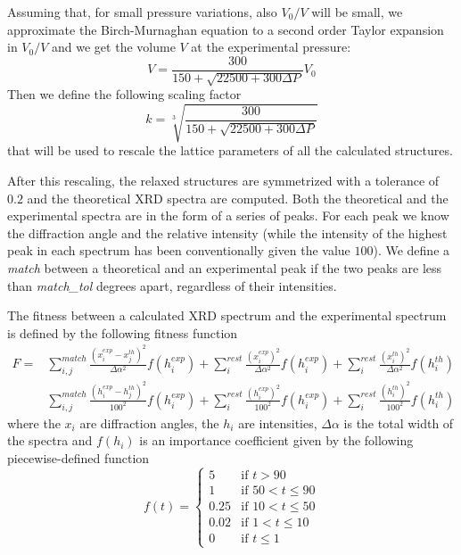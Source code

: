\documentclass{article}
\begin{document}
Assuming that, for small pressure variations, also $V_0/V$ will be small, we approximate the Birch-Murnaghan equation to a second order Taylor expansion in $V_0/V$ and we get the volume $V$ at the experimental pressure:
\begin{equation*}
	V = \frac{300}{150 + \sqrt{22500 + 300 \Delta P}} V_0
\end{equation*}
Then we define the following scaling factor
\begin{equation*}
	k = \sqrt[3]{\frac{300}{150 + \sqrt{22500 + 300 \Delta P}}}
\end{equation*}
that will be used to rescale the lattice parameters of all the calculated structures.

After this rescaling, the relaxed structures are symmetrized with a tolerance of $0.2$ and the theoretical XRD spectra are computed. Both the theoretical and the experimental spectra are in the form of a series of peaks. For each peak we know the diffraction angle and the relative intensity (while the intensity of the highest peak in each spectrum has been conventionally given the value $100$). We define a \emph{match} between a theoretical and an experimental peak if the two peaks are less than \emph{match\_tol} degrees apart, regardless of their intensities.

The fitness between a calculated XRD spectrum and the experimental spectrum is defined by the following fitness function
\begin{align*}
	F = &\sum_{i, j}^{match} \frac{(x_i^{exp} - x_j^{th})^2}{\Delta \alpha^2} f(h_i^{exp}) + \sum_i^{rest} \frac{(x_i^{exp})^2}{\Delta \alpha^2} f(h_i^{exp}) + \sum_i^{rest} \frac{(x_i^{th})^2}{\Delta \alpha^2} f(h_i^{th}) \\
	&\sum_{i, j}^{match} \frac{(h_i^{exp} - h_j^{th})^2}{100^2} f(h_i^{exp}) + \sum_i^{rest} \frac{(h_i^{exp})^2}{100^2} f(h_i^{exp}) + \sum_i^{rest} \frac{(h_i^{th})^2}{100^2} f(h_i^{th})
\end{align*}
where the $x_i$ are diffraction angles, the $h_i$ are intensities, $\Delta \alpha$ is the total width of the spectra and $f(h_i)$ is an importance coefficient given by the following piecewise-defined function
\begin{equation*}
	f(t)=
	\begin{cases}
		5 & \text{if $t > 90$} \\
		1 & \text{if $50 < t \le 90$} \\
		0.25 & \text{if $10 < t \le 50$} \\
		0.02 & \text{if $1 < t \le 10$} \\
		0 & \text{if $t \le 1$}
	\end{cases}
\end{equation*}
\end{document}
